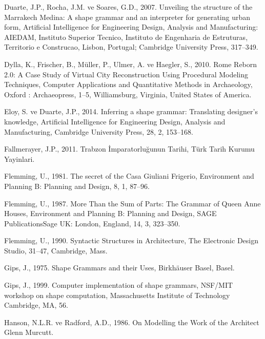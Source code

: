 \documentclass[12pt,turkish,a4paperpaper,]{report}
\begin{document}
\leavevmode\hypertarget{ref-Duarte:2007eq}{}%
Duarte, J.P., Rocha, J.M. ve Soares, G.D., 2007. Unveiling the structure
of the Marrakech Medina: A shape grammar and an interpreter for
generating urban form, Artificial Intelligence for Engineering Design,
Analysis and Manufacturing: AIEDAM, Instituto Superior Tecnico,
Instituto de Engenharia de Estruturas, Territorio e Construcao, Lisbon,
Portugal; Cambridge University Press, 317--349.

\leavevmode\hypertarget{ref-Dylla:2010tm}{}%
Dylla, K., Frischer, B., Müller, P., Ulmer, A. ve Haegler, S., 2010.
Rome Reborn 2.0: A Case Study of Virtual City Reconstruction Using
Procedural Modeling Techniques, Computer Applications and Quantitative
Methods in Archaeology, Oxford : Archaeopress, 1--5, Williamsburg,
Virginia, United States of America.

\leavevmode\hypertarget{ref-Eloy:2014kn}{}%
Eloy, S. ve Duarte, J.P., 2014. Inferring a shape grammar: Translating
designer's knowledge, Artificial Intelligence for Engineering Design,
Analysis and Manufacturing, Cambridge University Press, 28, 2, 153--168.

\leavevmode\hypertarget{ref-Fallmerayer:2011vq}{}%
Fallmerayer, J.P., 2011. Trabzon İmparatorluğunun Tarihi, Türk Tarih
Kurumu Yayinlari.

\leavevmode\hypertarget{ref-Flemming:1981hm}{}%
Flemming, U., 1981. The secret of the Casa Giuliani Frigerio,
Environment and Planning B: Planning and Design, 8, 1, 87--96.

\leavevmode\hypertarget{ref-Flemming:1987js}{}%
Flemming, U., 1987. More Than the Sum of Parts: The Grammar of Queen
Anne Houses, Environment and Planning B: Planning and Design, SAGE
PublicationsSage UK: London, England, 14, 3, 323--350.

\leavevmode\hypertarget{ref-Flemming:1990tn}{}%
Flemming, U., 1990. Syntactic Structures in Architecture, The Electronic
Design Studio, 31--47, Cambridge, Mass.

\leavevmode\hypertarget{ref-Gips:1975jg}{}%
Gips, J., 1975. Shape Grammars and their Uses, Birkhäuser Basel, Basel.

\leavevmode\hypertarget{ref-Gips:1999ut}{}%
Gips, J., 1999. Computer implementation of shape grammars, NSF/MIT
workshop on shape computation, Massachusetts Institute of Technology
Cambridge, MA, 56.

\leavevmode\hypertarget{ref-Hanson:1986ty}{}%
Hanson, N.L.R. ve Radford, A.D., 1986. On Modelling the Work of the
Architect Glenn Murcutt.
\end{document}
